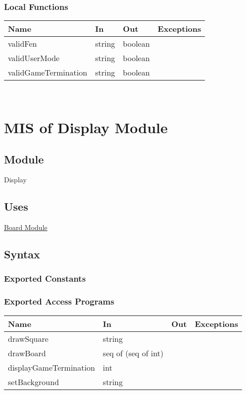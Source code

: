 \documentclass[12pt, titlepage]{article}
\begin{document}
    \subsubsection{Local Functions}
        \begin{center}
        \begin{tabular}{p{4.5cm} p{3cm} p{4cm} p{2.5cm}}
        \hline
        \textbf{Name} & \textbf{In} & \textbf{Out} & \textbf{Exceptions} \\
        \hline
        validFen & string & boolean & \\
        \hline
        validUserMode & string & boolean & \\
        \hline
        validGameTermination & string & boolean & \\
        \end{tabular}
        \end{center}
    
        ~\newpage

\section{MIS of Display Module} \label{mDisplay}

    \subsection{Module}
    Display

    \subsection{Uses}
    \hyperref[mBoard]{Board Module}

    \subsection{Syntax}
    \subsubsection{Exported Constants}

    \subsubsection{Exported Access Programs}
        \begin{center}
        \begin{tabular}{p{5cm} p{3.5cm} p{3cm} p{2.5cm}}
        \hline
        \textbf{Name} & \textbf{In} & \textbf{Out} & \textbf{Exceptions} \\
        \hline
        drawSquare & string & & \\
        \hline
        drawBoard & seq of (seq of int) & & \\
        \hline
        displayGameTermination & int & & \\
        \hline
        setBackground & string & & \\
        \hline
        \end{tabular}
        \end{center}
\end{document}
